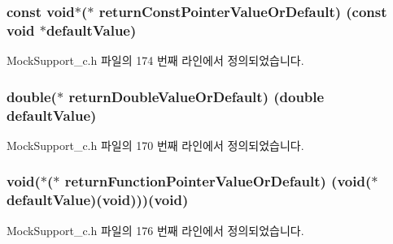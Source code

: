 \subsubsection[{\texorpdfstring{return\+Const\+Pointer\+Value\+Or\+Default}{returnConstPointerValueOrDefault}}]{\setlength{\rightskip}{0pt plus 5cm}const void$\ast$($\ast$ return\+Const\+Pointer\+Value\+Or\+Default) (const void $\ast$default\+Value)}\hypertarget{struct_s_mock_support__c_addb8be61d99e230985589991a3789da2}{}\label{struct_s_mock_support__c_addb8be61d99e230985589991a3789da2}


Mock\+Support\+\_\+c.\+h 파일의 174 번째 라인에서 정의되었습니다.

\subsubsection[{\texorpdfstring{return\+Double\+Value\+Or\+Default}{returnDoubleValueOrDefault}}]{\setlength{\rightskip}{0pt plus 5cm}double($\ast$ return\+Double\+Value\+Or\+Default) (double default\+Value)}\hypertarget{struct_s_mock_support__c_af0c6afe5e9c03b93b3f636894f06f7fd}{}\label{struct_s_mock_support__c_af0c6afe5e9c03b93b3f636894f06f7fd}


Mock\+Support\+\_\+c.\+h 파일의 170 번째 라인에서 정의되었습니다.

\subsubsection[{\texorpdfstring{return\+Function\+Pointer\+Value\+Or\+Default}{returnFunctionPointerValueOrDefault}}]{\setlength{\rightskip}{0pt plus 5cm}void($\ast$($\ast$ return\+Function\+Pointer\+Value\+Or\+Default) (void($\ast$default\+Value)(void)))(void)}\hypertarget{struct_s_mock_support__c_ab5269cbc4eeedac5d28749d686d40b1b}{}\label{struct_s_mock_support__c_ab5269cbc4eeedac5d28749d686d40b1b}


Mock\+Support\+\_\+c.\+h 파일의 176 번째 라인에서 정의되었습니다.

